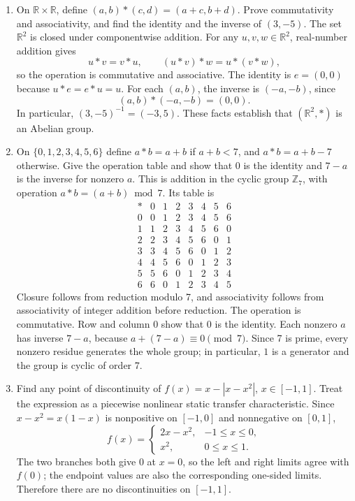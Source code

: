 \begin{enumerate}[leftmargin=4mm,itemsep=9pt]
\[\[\[\[\textbf{3. Transitive.} Transitivity requires $(a,b),(b,c)\in R$ to imply $(a,c)\in R$. Choose $a=\sqrt3$, $b=0$, and $c=2\sqrt3$. Then
\[
a-b+\sqrt3=2\sqrt3,\qquad b-c+\sqrt3=-\sqrt3,
\]
both irrational, so $(a,b),(b,c)\in R$. However,
\[
a-c+\sqrt3=\sqrt3-2\sqrt3+\sqrt3=0,
\]
which is rational. Thus $(a,c)\notin R$, and $R$ is not transitive.

\textbf{Conclusion.} $R\text{ is reflexive, but neither symmetric nor transitive.}$

\item On $\mathbb R\times\mathbb R$, define $(a,b)*(c,d)=(a+c,b+d)$. Prove commutativity and associativity, and find the identity and the inverse of $(3,-5)$.
\solution The set $\mathbb R^2$ is closed under componentwise addition. For any $u,v,w\in\mathbb R^2$, real-number addition gives
\[
u*v=v*u,\qquad (u*v)*w=u*(v*w),
\]
so the operation is commutative and associative. The identity is $e=(0,0)$ because $u*e=e*u=u$. For each $(a,b)$, the inverse is $(-a,-b)$, since
\[
(a,b)*(-a,-b)=(0,0).
\]
In particular, $(3,-5)^{-1}=(-3,5)$. These facts establish that $(\mathbb R^2,*)$ is an Abelian group.

\item On $\{0,1,2,3,4,5,6\}$ define $a*b=a+b$ if $a+b<7$, and $a*b=a+b-7$ otherwise. Give the operation table and show that 0 is the identity and $7-a$ is the inverse for nonzero $a$.
\solution This is addition in the cyclic group $\mathbb Z_7$, with operation $a*b=(a+b)\bmod7$. Its table is
\[
\begin{array}{c|rrrrrrr}
* &0&1&2&3&4&5&6\\\hline
0&0&1&2&3&4&5&6\\
1&1&2&3&4&5&6&0\\
2&2&3&4&5&6&0&1\\
3&3&4&5&6&0&1&2\\
4&4&5&6&0&1&2&3\\
5&5&6&0&1&2&3&4\\
6&6&0&1&2&3&4&5
\end{array}
\]
Closure follows from reduction modulo 7, and associativity follows from associativity of integer addition before reduction. The operation is commutative. Row and column 0 show that 0 is the identity. Each nonzero $a$ has inverse $7-a$, because $a+(7-a)\equiv0\pmod7$. Since 7 is prime, every nonzero residue generates the whole group; in particular, $1$ is a generator and the group is cyclic of order 7.

\item Find any point of discontinuity of $f(x)=x-|x-x^2|$, $x\in[-1,1]$.
\solution Treat the expression as a piecewise nonlinear static transfer characteristic. Since $x-x^2=x(1-x)$ is nonpositive on $[-1,0]$ and nonnegative on $[0,1]$,
\[
f(x)=
\begin{cases}
2x-x^2,&-1\le x\le0,\\
x^2,&0\le x\le1.
\end{cases}
\]
The two branches both give 0 at $x=0$, so the left and right limits agree with $f(0)$; the endpoint values are also the corresponding one-sided limits. Therefore there are no discontinuities on $[-1,1]$.

\]\]\]\]
\end{enumerate}
